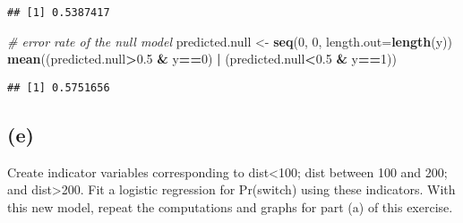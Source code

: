 \documentclass[
]{article}
\newenvironment{Shaded}{\begin{snugshade}}{\end{snugshade}}
\newcommand{\CommentTok}[1]{\textcolor[rgb]{0.56,0.35,0.01}{\textit{#1}}}
\newcommand{\ControlFlowTok}[1]{\textcolor[rgb]{0.13,0.29,0.53}{\textbf{#1}}}
\newcommand{\DataTypeTok}[1]{\textcolor[rgb]{0.13,0.29,0.53}{#1}}
\newcommand{\DecValTok}[1]{\textcolor[rgb]{0.00,0.00,0.81}{#1}}
\newcommand{\FloatTok}[1]{\textcolor[rgb]{0.00,0.00,0.81}{#1}}
\newcommand{\KeywordTok}[1]{\textcolor[rgb]{0.13,0.29,0.53}{\textbf{#1}}}
\newcommand{\NormalTok}[1]{#1}
\newcommand{\OperatorTok}[1]{\textcolor[rgb]{0.81,0.36,0.00}{\textbf{#1}}}
\newcommand{\StringTok}[1]{\textcolor[rgb]{0.31,0.60,0.02}{#1}}
\begin{document}
\begin{verbatim}
## [1] 0.5387417
\end{verbatim}

\begin{Shaded}
\begin{Highlighting}[]
\CommentTok{# error rate of the null model}
\NormalTok{predicted.null <-}\StringTok{ }\KeywordTok{seq}\NormalTok{(}\DecValTok{0}\NormalTok{, }\DecValTok{0}\NormalTok{, }\DataTypeTok{length.out=}\KeywordTok{length}\NormalTok{(y))}
\KeywordTok{mean}\NormalTok{((predicted.null}\OperatorTok{>}\FloatTok{0.5} \OperatorTok{&}\StringTok{ }\NormalTok{y}\OperatorTok{==}\DecValTok{0}\NormalTok{) }\OperatorTok{|}\StringTok{ }\NormalTok{(predicted.null}\OperatorTok{<}\FloatTok{0.5} \OperatorTok{&}\StringTok{ }\NormalTok{y}\OperatorTok{==}\DecValTok{1}\NormalTok{))}
\end{Highlighting}
\end{Shaded}

\begin{verbatim}
## [1] 0.5751656
\end{verbatim}

\hypertarget{e}{%
\subsection{(e)}\label{e}}

Create indicator variables corresponding to dist\textless100; dist
between 100 and 200; and dist\textgreater200. Fit a logistic regression
for Pr(switch) using these indicators. With this new model, repeat the
computations and graphs for part (a) of this exercise.

\begin{Shaded}
\end{Shaded}
\end{document}
